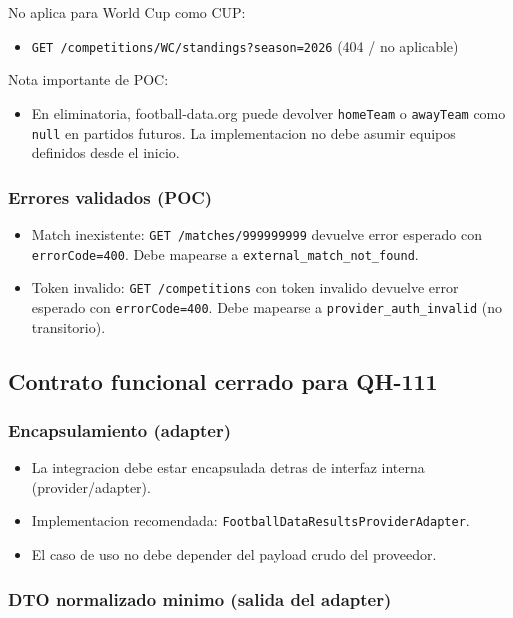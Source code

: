 No aplica para World Cup como CUP:
\begin{itemize}
  \item \texttt{GET /competitions/WC/standings?season=2026} (404 / no aplicable)
\end{itemize}

Nota importante de POC:
\begin{itemize}
  \item En eliminatoria, football-data.org puede devolver \texttt{homeTeam} o \texttt{awayTeam} como \texttt{null} en partidos futuros. La implementacion no debe asumir equipos definidos desde el inicio.
\end{itemize}

\subsubsection{Errores validados (POC)}

\begin{itemize}
  \item Match inexistente: \texttt{GET /matches/999999999} devuelve error esperado con \texttt{errorCode=400}. Debe mapearse a \texttt{external\_match\_not\_found}.
  \item Token invalido: \texttt{GET /competitions} con token invalido devuelve error esperado con \texttt{errorCode=400}. Debe mapearse a \texttt{provider\_auth\_invalid} (no transitorio).
\end{itemize}

\subsection{Contrato funcional cerrado para QH-111}

\subsubsection{Encapsulamiento (adapter)}

\begin{itemize}
  \item La integracion debe estar encapsulada detras de interfaz interna (provider/adapter).
  \item Implementacion recomendada: \texttt{FootballDataResultsProviderAdapter}.
  \item El caso de uso no debe depender del payload crudo del proveedor.
\end{itemize}

\subsubsection{DTO normalizado minimo (salida del adapter)}

